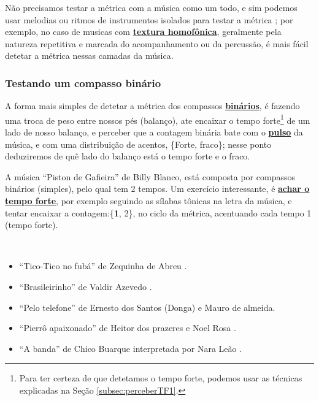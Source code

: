 Não precisamos testar a métrica com a música como um todo,
e sim podemos usar melodias ou ritmos de instrumentos isolados para testar a métrica \cite[pp. 10]{wright1992social};
por exemplo, no caso de musicas com \hyperref[subsec:homofonica]{\textbf{textura homofônica}},
geralmente pela natureza repetitiva e marcada do acompanhamento ou da percussão,
é mais fácil detetar a métrica nessas camadas da música.

\subsubsection{Testando um compasso binário}
A forma mais simples de detetar a métrica dos compassos \hyperref[subsec:compassobinario]{\textbf{binários}},
é fazendo uma troca de peso entre nossos pés (balanço),
ate encaixar o tempo forte\footnote{Para ter certeza de que detetamos o tempo forte, 
podemos usar as técnicas explicadas na Seção \ref{subsec:perceberTF1}.} 
de um lado de nosso balanço,
e perceber que a contagem binária bate com o \hyperref[ref:Pulso]{\textbf{pulso}} da música,
e com uma distribuição de acentos, \{Forte, fraco\};
nesse ponto deduziremos de quê lado do balanço está o tempo forte e o fraco.

\begin{example}
\label{ex:compassosimples3t}
A música ``Piston de Gafieira'' de Billy Blanco,
está composta por compassos binários (simples), pelo qual tem 2 tempos.
Um exercício interessante, é \hyperref[subsec:perceberTF1]{\textbf{achar o tempo forte}},
por exemplo seguindo as sílabas tônicas na letra da música,
e tentar encaixar a contagem:\{\textbf{1}, 2\}, no ciclo da métrica, acentuando cada tempo 1 (tempo forte). 
\end{example}

\begin{example}
~
\begin{itemize}
\item ``Tico-Tico no fubá'' de Zequinha de Abreu  \cite[pp. 6]{marcondes1998enciclopedia} \cite[pp. 39,91]{diniz2003almanaque}.
\item ``Brasileirinho'' de Valdir Azevedo  \cite[pp. 133]{perna2002samba}.
\item ``Pelo telefone'' de  Ernesto dos Santos (Donga) e Mauro de almeida.
\item ``Pierrô apaixonado'' de Heitor dos prazeres e Noel Rosa \cite[pp. 1070]{marcondes1977enciclopediav2} \cite[pp. 53]{diniz2008almanaque}.
\item ``A banda'' de Chico Buarque interpretada por Nara Leão \cite[pp. 90]{diniz2008almanaque} \cite{partituraabanda1}.
\end{itemize}
\end{example}


